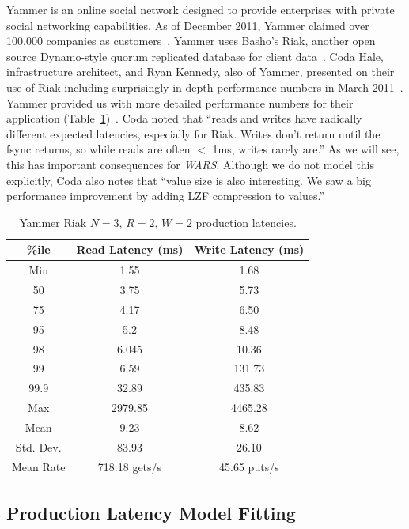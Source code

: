 \documentclass{vldb}
\begin{document}
Yammer is an online social network designed to provide enterprises
with private social networking capabilities.  As of December 2011,
Yammer claimed over 100,000 companies as customers~\cite{yammer}.
Yammer uses Basho's Riak, another open source Dynamo-style quorum
replicated database for client data~\cite{riak}.  Coda Hale,
infrastructure architect, and Ryan Kennedy, also of Yammer, presented
on their use of Riak including surprisingly in-depth performance
numbers in March 2011~\cite{riakyammer}.  Yammer provided us with more
detailed performance numbers for their application
(Table~\ref{table:yammer})~\cite{codapc}.  Coda noted that ``reads and
writes have radically different expected latencies, especially for
Riak. Writes don't return until the fsync returns, so while reads are
often $<$ 1ms, writes rarely are.''  As we will see, this has
important consequences for \textit{WARS}.  Although we do not model
this explicitly, Coda also notes that ``value size is also
interesting. We saw a big performance improvement by adding LZF
compression to values.''

\begin{table}
\begin{center}
\begin{tabular}{|c|c|c|}
\hline
\%ile & Read Latency (ms) & Write Latency (ms)\\
\hline
Min & 1.55 & 1.68\\
50 & 3.75 & 5.73 \\
75 & 4.17 & 6.50\\
95 & 5.2 & 8.48\\
98 & 6.045 & 10.36 \\
99 & 6.59 & 131.73\\
99.9 & 32.89 & 435.83\\
Max & 2979.85 &  4465.28 \\
\hline
Mean & 9.23 & 8.62 \\
Std. Dev. & 83.93 & 26.10\\
\hline
Mean Rate & 718.18 gets/s & 45.65 puts/s\\
\hline
\end{tabular}
\caption{Yammer Riak $N$$=$$3$, $R$$=$$2$, $W$$=$$2$ production latencies.}
\label{table:yammer}
\end{center}
\end{table}

\subsection{Production Latency Model Fitting}
\end{document}
